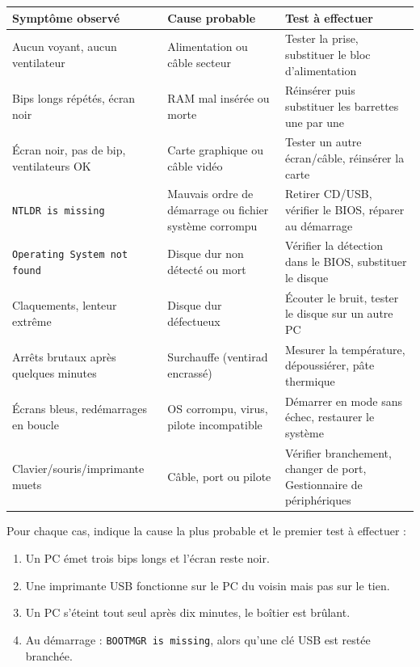 \documentclass[11pt]{article}
\begin{document}
\begin{center}
\begin{tabularx}{\linewidth}{|X|X|X|}
\hline
\rowcolor{popblueL} \textbf{Symptôme observé} & \textbf{Cause probable} & \textbf{Test à effectuer} \\
\hline
Aucun voyant, aucun ventilateur & Alimentation ou câble secteur & Tester la prise, substituer le bloc d'alimentation \\
\hline
Bips longs répétés, écran noir & RAM mal insérée ou morte & Réinsérer puis substituer les barrettes une par une \\
\hline
Écran noir, pas de bip, ventilateurs OK & Carte graphique ou câble vidéo & Tester un autre écran/câble, réinsérer la carte \\
\hline
\texttt{NTLDR is missing} & Mauvais ordre de démarrage ou fichier système corrompu & Retirer CD/USB, vérifier le BIOS, réparer au démarrage \\
\hline
\texttt{Operating System not found} & Disque dur non détecté ou mort & Vérifier la détection dans le BIOS, substituer le disque \\
\hline
Claquements, lenteur extrême & Disque dur défectueux & Écouter le bruit, tester le disque sur un autre PC \\
\hline
Arrêts brutaux après quelques minutes & Surchauffe (ventirad encrassé) & Mesurer la température, dépoussiérer, pâte thermique \\
\hline
Écrans bleus, redémarrages en boucle & OS corrompu, virus, pilote incompatible & Démarrer en mode sans échec, restaurer le système \\
\hline
Clavier/souris/imprimante muets & Câble, port ou pilote & Vérifier branchement, changer de port, Gestionnaire de périphériques \\
\hline
\end{tabularx}
\end{center}

\begin{exercice}
Pour chaque cas, indique la cause la plus probable et le premier test à effectuer :
\begin{enumerate}
\item Un PC émet trois bips longs et l'écran reste noir.
\item Une imprimante USB fonctionne sur le PC du voisin mais pas sur le tien.
\item Un PC s'éteint tout seul après dix minutes, le boîtier est brûlant.
\item Au démarrage : \texttt{BOOTMGR is missing}, alors qu'une clé USB est restée branchée.
\end{enumerate}
\end{exercice}
\end{document}
